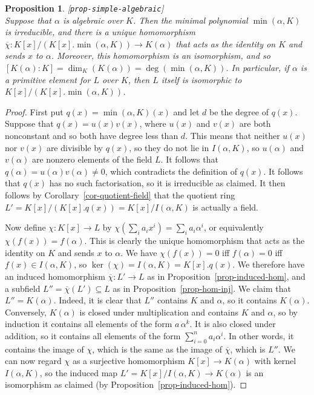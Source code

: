 \documentclass{amsart}
\newcommand{\lbl}[1]{\label{#1}\textup{[\texttt{#1}]}\ \\}
\newcommand{\lbl}{\label}
\newcommand{\al}        {\alpha}
\newcommand{\ov}[1]     {\overline{#1}}
\newcommand{\sse}       {\subseteq}
\renewcommand{\:}{\colon}
\newtheorem{proposition}[theorem]{Proposition}
\theoremstyle{definition}
\begin{document}
\begin{proposition}\lbl{prop-simple-algebraic}
 Suppose that $\al$ is algebraic over $K$.  Then the minimal
 polynomial $\min(\al,K)$ is irreducible, and there is a unique
 homomorphism $\ov{\chi}\:K[x]/(K[x].\min(\al,K))\to K(\al)$ that acts
 as the identity on $K$ and sends $x$ to $\al$.  Moreover, this
 homomorphism is an isomorphism, and so
 $[K(\al):K]=\dim_K(K(\al))=\deg(\min(\al,K))$.  In particular, if
 $\al$ is a primitive element for $L$ over $K$, then $L$ itself is
 isomorphic to $K[x]/(K[x].\min(\al,K))$.
\end{proposition}
\begin{proof}
 First put $q(x)=\min(\al,K)(x)$ and let $d$ be the degree of $q(x)$.
 Suppose that $q(x)=u(x)v(x)$, where $u(x)$ and $v(x)$ are both
 nonconstant and so both have degree less than $d$.  This means that
 neither $u(x)$ nor $v(x)$ are divisible by $q(x)$, so they do not lie
 in $I(\al,K)$, so $u(\al)$ and $v(\al)$ are nonzero elements of the
 field $L$.  It follows that $q(\al)=u(\al)v(\al)\neq 0$, which
 contradicts the definition of $q(x)$.  It follows that $q(x)$ has no
 such factorisation, so it is irreducible as claimed.  It then follows
 by Corollary~\ref{cor-quotient-field} that the quotient ring
 $L'=K[x]/(K[x].q(x))=K[x]/I(\al,K)$ is actually a field.

 Now define $\chi\:K[x]\to L$ by $\chi(\sum_ia_ix^i)=\sum_ia_i\al^i$, or
 equivalently $\chi(f(x))=f(\al)$.  This is clearly the unique
 homomorphism that acts as the identity on $K$ and sends $x$ to
 $\al$.  We have $\chi(f(x))=0$ iff $f(\al)=0$ iff $f(x)\in I(\al,K)$, so
 $\ker(\chi)=I(\al,K)=K[x].q(x)$.  We therefore have an induced
 homomorphism $\ov{\chi}\:L'\to L$ as in
 Proposition~\ref{prop-induced-hom}, and a subfield
 $L''=\ov{\chi}(L')\sse L$ as in Proposition~\ref{prop-hom-inj}.  We
 claim that $L''=K(\al)$.  Indeed, it is clear that $L''$ contains $K$
 and $\al$, so it contains $K(\al)$.  Conversely, $K(\al)$ is closed
 under multiplication and contains $K$ and $\al$, so by induction it
 contains all elements of the form $a\,\al^k$.  It is also closed
 under addition, so it contains all elements of the form
 $\sum_{i=0}^na_i\al^i$.  In other words, it contains the image of
 $\chi$, which is the same as the image of $\ov{\chi}$, which is
 $L''$.  We can now regard $\chi$ as a surjective homomorphism
 $K[x]\to K(\al)$ with kernel $I(\al,K)$, so the induced map
 $L'=K[x]/I(\al,K)\to K(\al)$ is an isomorphism as claimed (by
 Proposition~\ref{prop-induced-hom}). 
\end{proof}
\end{document}

